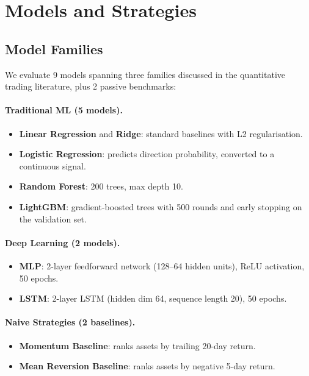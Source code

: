 \documentclass[preprint,review,12pt]{elsarticle}
\begin{document}
\section{Models and Strategies}
\label{sec:models}

\subsection{Model Families}

We evaluate 9 models spanning three families discussed in the quantitative trading literature, plus 2 passive benchmarks:

\paragraph{Traditional ML (5 models).}
\begin{itemize}[leftmargin=1.4em]
  \item \textbf{Linear Regression} and \textbf{Ridge}: standard baselines with L2 regularisation.
  \item \textbf{Logistic Regression}: predicts direction probability, converted to a continuous signal.
  \item \textbf{Random Forest}: 200 trees, max depth 10.
  \item \textbf{LightGBM}: gradient-boosted trees with 500 rounds and early stopping on the validation set.
\end{itemize}

\paragraph{Deep Learning (2 models).}
\begin{itemize}[leftmargin=1.4em]
  \item \textbf{MLP}: 2-layer feedforward network (128--64 hidden units), ReLU activation, 50 epochs.
  \item \textbf{LSTM}: 2-layer LSTM (hidden dim 64, sequence length 20), 50 epochs.
\end{itemize}

\paragraph{Naive Strategies (2 baselines).}
\begin{itemize}[leftmargin=1.4em]
  \item \textbf{Momentum Baseline}: ranks assets by trailing 20-day return.
  \item \textbf{Mean Reversion Baseline}: ranks assets by negative 5-day return.
\end{itemize}
\end{document}
